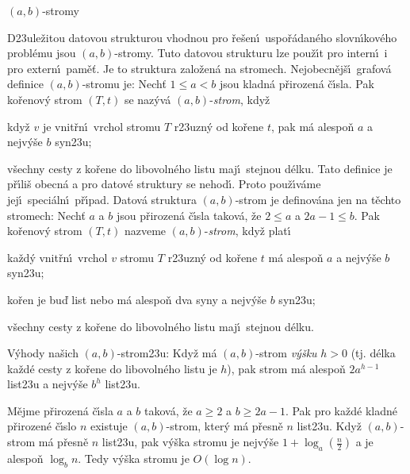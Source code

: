 \heading
$\left(a,b\right)$-stromy
\endheading

\flushpar D\accent23ule\v zitou datovou strukturou vhodnou pro 
\v re\v sen\'\i\ uspo\v r\'a\-dan\'e\-ho slovn\'\i\-ko\-v\'e\-ho probl\'emu jsou 
$\left(a,b\right)$-stromy. Tuto datovou strukturu lze pou\v z\'\i t pro intern\'\i\ i 
pro extern\'\i\ pam\v e\v t. Je to struktura zalo\v zen\'a na stromech. 
Nejobecn\v ej\v s\'\i\ grafov\'a defini\-ce $\left(a,b\right)$-stromu je:\newline 
Nech\v t $1\le a<b$ jsou kladn\'a p\v rirozen\'a \v c\'\i sla. Pak ko\v renov\'y 
strom $\left(T,t\right)$ se naz\'yv\'a $\left(a,b\right)$-\emph{strom}, kdy\v z 
\roster
\item
kdy\v z $v$ je vnit\v rn\'\i\ vrchol stromu $T$ r\accent23uzn\'y od 
ko\v rene $t$, pak m\'a alespo\v n $a$ a nejv\'y\v se $b$ syn\accent23u;
\item
v\v sechny cesty z ko\v rene do libovoln\'eho listu maj\'\i\ 
stejnou d\'elku.
\endroster
Tato definice je p\v r\'\i li\v s obecn\'a a pro datov\'e struktury se 
nehod\'\i . Proto pou\v z\'\i v\'ame jej\'\i\ speci\'aln\'\i\ p\v r\'\i pad. Datov\'a 
struktura $\left(a,b\right)$-strom je definov\'ana jen na t\v echto stromech: 
Nech\v t $a$ a $b$ jsou p\v rirozen\'a \v c\'\i sla takov\'a, \v ze $
2\le a$ a 
$2a-1\le b$. Pak ko\v renov\'y 
strom $\left(T,t\right)$ nazveme $\left(a,b\right)$-\emph{strom}, kdy\v z plat\'\i\ 
\roster
\item
ka\v zd\'y vnit\v rn\'\i\ vrchol $v$ stromu $T$ r\accent23uzn\'y od 
ko\v rene $t$ m\'a alespo\v n $a$ a nejv\'y\v se $b$ syn\accent23u;
\item
ko\v ren je bu\v d list nebo m\'a alespo\v n dva syny a nejv\'y\v se $
b$ 
syn\accent23u;
\item
v\v sechny cesty z ko\v rene do libovoln\'eho listu maj\'\i\ 
stejnou d\'elku.
\endroster
\medskip

\flushpar V\'yhody na\v sich $\left(a,b\right)$-strom\accent23u:\newline 
Kdy\v z m\'a $\left(a,b\right)$-strom \emph{v\'y\v sku} $h>0$ (tj. d\'elka ka\v zd\'e 
cesty z ko\v rene do libovoln\'eho listu je $h$), pak 
strom m\'a alespo\v n $2a^{h-1}$ list\accent23u a nejv\'y\v se $b^
h$ 
list\accent23u.


M\v ejme p\v rirozen\'a \v c\'\i sla $a$ a $
b$ takov\'a, 
\v ze $a\ge 2$ a $b\ge 2a-1$. Pak pro ka\v zd\'e kladn\'e p\v rirozen\'e 
\v c\'\i slo $n$ existuje $\left(a,b\right)$-strom, kter\'y m\'a p\v resn\v e $
n$ 
list\accent23u. Kdy\v z $\left(a,b\right)$-strom m\'a p\v resn\v e $n$ 
list\accent23u, pak v\'y\v ska stromu je nejv\'y\v se $1+\log_a\left(\frac 
n2\right)$ a 
je alespo\v n $\log_bn$. Tedy v\'y\v ska stromu je $O\left(\log n\right)$.
\endproclaim


